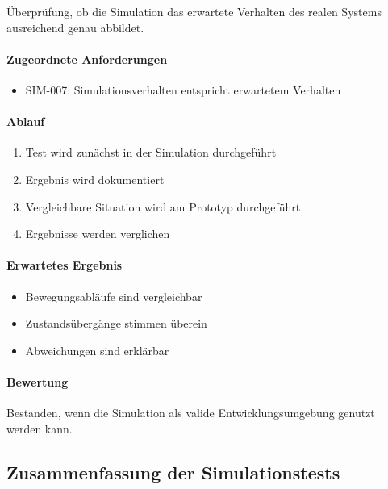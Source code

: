 \documentclass[
  a4paper,
  12pt,
  DIV=12,        %
  parskip=half,  %
  headings=small %
]{scrartcl}
\theoremstyle{definition}
\providecommand{\tightlist}{%
  \setlength{\itemsep}{0pt}\setlength{\parskip}{0pt}}
\theoremstyle{definition}
\begin{document}
Überprüfung, ob die Simulation das erwartete Verhalten des realen
Systems ausreichend genau abbildet.

\paragraph{Zugeordnete
Anforderungen}\label{zugeordnete-anforderungen-23}

\begin{itemize}
\tightlist
\item
  SIM-007: Simulationsverhalten entspricht erwartetem Verhalten
\end{itemize}

\paragraph{Ablauf}\label{ablauf-23}

\begin{enumerate}
\def\labelenumi{\arabic{enumi}.}
\tightlist
\item
  Test wird zunächst in der Simulation durchgeführt
\item
  Ergebnis wird dokumentiert
\item
  Vergleichbare Situation wird am Prototyp durchgeführt
\item
  Ergebnisse werden verglichen
\end{enumerate}

\paragraph{Erwartetes Ergebnis}\label{erwartetes-ergebnis-23}

\begin{itemize}
\tightlist
\item
  Bewegungsabläufe sind vergleichbar
\item
  Zustandsübergänge stimmen überein
\item
  Abweichungen sind erklärbar
\end{itemize}

\paragraph{Bewertung}\label{bewertung-23}

Bestanden, wenn die Simulation als valide Entwicklungsumgebung genutzt
werden kann.

\subsection{Zusammenfassung der
Simulationstests}\label{zusammenfassung-der-simulationstests}
\end{document}
